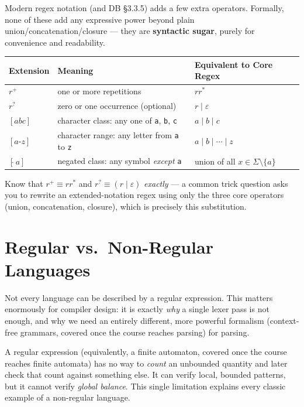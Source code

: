 \documentclass[full-course-notes.tex]{subfiles}
\begin{document}
\beyonddb Modern regex notation (and DB \S3.3.5) adds a few extra operators. Formally, none of
these add any expressive power beyond plain union/concatenation/closure --- they are
\textbf{syntactic sugar}, purely for convenience and readability.

\begin{center}
\renewcommand{\arraystretch}{1.4}
\begin{tabularx}{\textwidth}{@{}l l X@{}}
\toprule
\textbf{Extension} & \textbf{Meaning} & \textbf{Equivalent to Core Regex} \\
\midrule
$r^{+}$ & one or more repetitions & $rr^{*}$ \\
$r^{?}$ & zero or one occurrence (optional) & $r \mid \varepsilon$ \\
$[abc]$ & character class: any one of \texttt{a}, \texttt{b}, \texttt{c} & $a \mid b \mid c$ \\
$[a\text{-}z]$ & character range: any letter from \texttt{a} to \texttt{z} & $a \mid b \mid
\cdots \mid z$ \\
$[\hat{}\,a]$ & negated class: any symbol \emph{except} \texttt{a} & union of all $x \in \Sigma
\setminus \{a\}$ \\
\bottomrule
\end{tabularx}
\end{center}

\begin{examfocus}
Know that $r^{+} \equiv rr^{*}$ and $r^{?} \equiv (r \mid \varepsilon)$ \emph{exactly} --- a
common trick question asks you to rewrite an extended-notation regex using only the three core
operators (union, concatenation, closure), which is precisely this substitution.
\end{examfocus}

\section{Regular vs.\ Non-Regular Languages}
\label{sec:l4-regular-vs-nonregular}

\dbtag Not every language can be described by a regular expression. This matters enormously for
compiler design: it is exactly \emph{why} a single lexer pass is not enough, and why we need an
entirely different, more powerful formalism (context-free grammars, covered once the course
reaches parsing) for parsing.

\begin{coreidea}
A regular expression (equivalently, a finite automaton, covered once the course reaches finite
automata) has no way to \emph{count} an unbounded quantity and later check that count against
something else. It can verify local, bounded patterns, but it cannot verify \emph{global
balance}. This single limitation explains every classic example of a non-regular language.
\end{coreidea}
\end{document}
